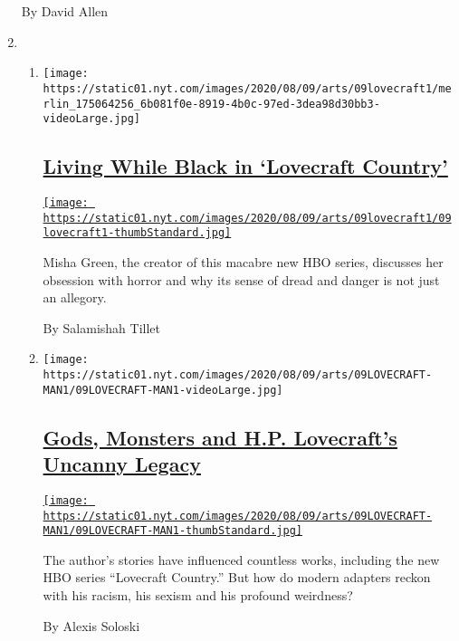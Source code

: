 \begin{enumerate}
  By David Allen
\item
  \begin{enumerate}
  \def\labelenumii{\arabic{enumii}.}
  \item
    \texttt{[image: https://static01.nyt.com/images/2020/08/09/arts/09lovecraft1/merlin\_175064256\_6b081f0e-8919-4b0c-97ed-3dea98d30bb3-videoLarge.jpg]}

    \hypertarget{living-while-black-in-lovecraft-country}{%
    \subsection{\texorpdfstring{\href{/2020/08/07/arts/television/living-while-black-in-lovecraft-country.html}{Living
    While Black in `Lovecraft
    Country'}}{Living While Black in `Lovecraft Country'}}\label{living-while-black-in-lovecraft-country}}

    \href{/2020/08/07/arts/television/living-while-black-in-lovecraft-country.html}{\texttt{[image: https://static01.nyt.com/images/2020/08/09/arts/09lovecraft1/09lovecraft1-thumbStandard.jpg]}}

    Misha Green, the creator of this macabre new HBO series, discusses
    her obsession with horror and why its sense of dread and danger is
    not just an allegory.

    By Salamishah Tillet
  \item
    \texttt{[image: https://static01.nyt.com/images/2020/08/09/arts/09LOVECRAFT-MAN1/09LOVECRAFT-MAN1-videoLarge.jpg]}

    \hypertarget{gods-monsters-and-hp-lovecrafts-uncanny-legacy}{%
    \subsection{\texorpdfstring{\href{/2020/08/07/arts/television/hp-lovecraft.html}{Gods,
    Monsters and H.P. Lovecraft's Uncanny
    Legacy}}{Gods, Monsters and H.P. Lovecraft's Uncanny Legacy}}\label{gods-monsters-and-hp-lovecrafts-uncanny-legacy}}

    \href{/2020/08/07/arts/television/hp-lovecraft.html}{\texttt{[image: https://static01.nyt.com/images/2020/08/09/arts/09LOVECRAFT-MAN1/09LOVECRAFT-MAN1-thumbStandard.jpg]}}

    The author's stories have influenced countless works, including the
    new HBO series ``Lovecraft Country.'' But how do modern adapters
    reckon with his racism, his sexism and his profound weirdness?

    By Alexis Soloski
  \end{enumerate}
\end{enumerate}

